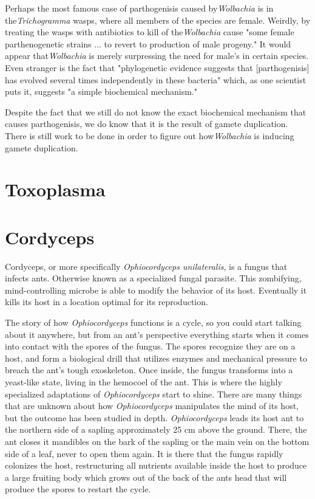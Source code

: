 \documentclass[twocolumn]{article}
\begin{document}
Perhaps the most famous case of parthogenisis caused by\textit{Wolbachia} is in the\textit{Trichogramma} wasps, where all members of the species are female. Weirdly, by treating the wasps with antibiotics to kill of the\textit{Wolbachia} cause "some female parthenogenetic strains ... to revert to production of male progeny."\cite{Wpar_removal} It would appear that\textit{Wolbachia} is merely surpressing the need for male's in certain species. Even stranger is the fact that "phylogenetic evidence suggests that [parthogenisis] has evolved several times independently in these bacteria" which, as one scientist puts it, suggests "a simple biochemical mechanism."\cite{Wbio}  

Despite the fact that we still do not know the exact biochemical mechanism that causes parthogenisis, we do know that it is the result of gamete duplication.\cite{Wgamete_duplication} There is still work to be done in order to figure out how\textit{Wolbachia} is inducing gamete duplication.

\section*{Toxoplasma}

\section*{Cordyceps}
Cordyceps, or more specifically \textit{Ophiocordyceps unilateralis}, is a fungus that infects ants. Otherwise known as a specialized fungal parasite. This zombifying, mind-controlling microbe is able to modify the behavior of its host. Eventually it kills its host in a location optimal for its reproduction. 

The story of how \textit{Ophiocordyceps} functions is a cycle, so you could start talking about it anywhere, but from an ant's perspective everything starts when it comes into contact with the spores of the fungus. The spores recognize they are on a host, and form a biological drill that utilizes enzymes and mechanical pressure to breach the ant's tough exoskeleton. Once inside, the fungus transforms into a yeast-like state, living in the hemocoel of the ant.\cite{cordy_infection} This is where the highly specialized adaptations of \textit{Ophiocordyceps} start to shine. There are many things that are unknown about how \textit{Ophiocordyceps} manipulates the mind of its host, but the outcome has been studied in depth. \textit{Ophiocordyceps} leads its host ant to the northern side of a sapling approximately 25 cm above the ground. There, the ant closes it mandibles on the bark of the sapling or the main vein on the bottom side of a leaf, never to open them again. It is there that the fungus rapidly colonizes the host, restructuring all nutrients available inside the host to produce a large fruiting body which grows out of the back of the ants head that will produce the spores to restart the cycle.\cite{life_of_dead_ant}
\end{document}
